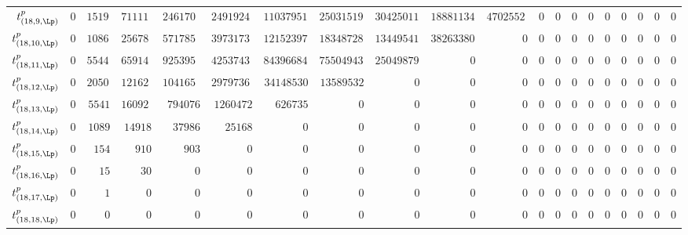 \begin{tabular}{r|rrrrrrrrrrrrrrrrrrr}
  $t^{p}_{(18,9,\Lp)}$ & $0$ & $151945$ & $71111516$ & $2461706532$ & $24919243688$ & $110379512955$ & $250315192338$ & $304250115400$ & $188811343696$ & $47025520065$ & $0$ & $0$ & $0$ & $0$ & $0$ & $0$ & $0$ & $0$ & $0$ \\
  $t^{p}_{(18,10,\Lp)}$ & $0$ & $108692$ & $25678980$ & $571785816$ & $3973173528$ & $12152397415$ & $18348728394$ & $13449541560$ & $3826338048$ & $0$ & $0$ & $0$ & $0$ & $0$ & $0$ & $0$ & $0$ & $0$ & $0$ \\
  $t^{p}_{(18,11,\Lp)}$ & $0$ & $55445$ & $6591450$ & $92539566$ & $425374320$ & $843966840$ & $755049432$ & $250498794$ & $0$ & $0$ & $0$ & $0$ & $0$ & $0$ & $0$ & $0$ & $0$ & $0$ & $0$ \\
  $t^{p}_{(18,12,\Lp)}$ & $0$ & $20503$ & $1216246$ & $10416531$ & $29797364$ & $34148530$ & $13589532$ & $0$ & $0$ & $0$ & $0$ & $0$ & $0$ & $0$ & $0$ & $0$ & $0$ & $0$ & $0$ \\
  $t^{p}_{(18,13,\Lp)}$ & $0$ & $5541$ & $160924$ & $794076$ & $1260472$ & $626735$ & $0$ & $0$ & $0$ & $0$ & $0$ & $0$ & $0$ & $0$ & $0$ & $0$ & $0$ & $0$ & $0$ \\
  $t^{p}_{(18,14,\Lp)}$ & $0$ & $1089$ & $14918$ & $37986$ & $25168$ & $0$ & $0$ & $0$ & $0$ & $0$ & $0$ & $0$ & $0$ & $0$ & $0$ & $0$ & $0$ & $0$ & $0$ \\
  $t^{p}_{(18,15,\Lp)}$ & $0$ & $154$ & $910$ & $903$ & $0$ & $0$ & $0$ & $0$ & $0$ & $0$ & $0$ & $0$ & $0$ & $0$ & $0$ & $0$ & $0$ & $0$ & $0$ \\
  $t^{p}_{(18,16,\Lp)}$ & $0$ & $15$ & $30$ & $0$ & $0$ & $0$ & $0$ & $0$ & $0$ & $0$ & $0$ & $0$ & $0$ & $0$ & $0$ & $0$ & $0$ & $0$ & $0$ \\
  $t^{p}_{(18,17,\Lp)}$ & $0$ & $1$ & $0$ & $0$ & $0$ & $0$ & $0$ & $0$ & $0$ & $0$ & $0$ & $0$ & $0$ & $0$ & $0$ & $0$ & $0$ & $0$ & $0$ \\
  $t^{p}_{(18,18,\Lp)}$ & $0$ & $0$ & $0$ & $0$ & $0$ & $0$ & $0$ & $0$ & $0$ & $0$ & $0$ & $0$ & $0$ & $0$ & $0$ & $0$ & $0$ & $0$ & $0$ \\
\end{tabular}
